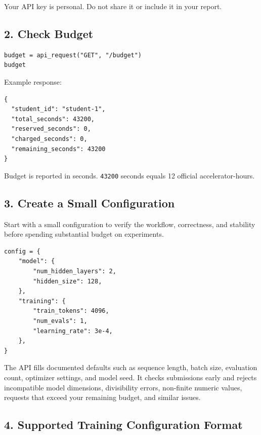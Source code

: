 \documentclass[
]{article}
\newcommand{\passthrough}[1]{#1}
\begin{document}
Your API key is personal. Do not share it or include it in your report.

\hypertarget{check-budget}{%
\subsection{2. Check Budget}\label{check-budget}}

\begin{verbatim}
budget = api_request("GET", "/budget")
budget
\end{verbatim}

Example response:

\begin{verbatim}
{
  "student_id": "student-1",
  "total_seconds": 43200,
  "reserved_seconds": 0,
  "charged_seconds": 0,
  "remaining_seconds": 43200
}
\end{verbatim}

Budget is reported in seconds. \passthrough{\lstinline!43200!} seconds
equals 12 official accelerator-hours.

\hypertarget{create-a-small-configuration}{%
\subsection{3. Create a Small
Configuration}\label{create-a-small-configuration}}

Start with a small configuration to verify the workflow, correctness,
and stability before spending substantial budget on experiments.

\begin{verbatim}
config = {
    "model": {
        "num_hidden_layers": 2,
        "hidden_size": 128,
    },
    "training": {
        "train_tokens": 4096,
        "num_evals": 1,
        "learning_rate": 3e-4,
    },
}
\end{verbatim}

The API fills documented defaults such as sequence length, batch size,
evaluation count, optimizer settings, and model seed. It checks
submissions early and rejects incompatible model dimensions,
divisibility errors, non-finite numeric values, requests that exceed
your remaining budget, and similar issues.

\hypertarget{supported-training-configuration-format}{%
\subsection{4. Supported Training Configuration
Format}\label{supported-training-configuration-format}}
\end{document}
